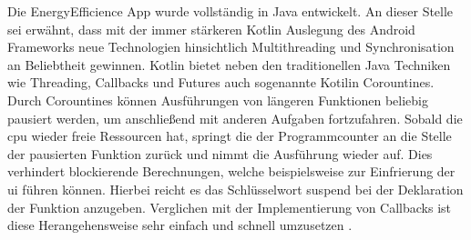 Die \glqq EnergyEfficience\grqq{} App wurde vollständig in Java entwickelt. An dieser Stelle sei erwähnt, dass mit der immer stärkeren Kotlin Auslegung des Android Frameworks neue Technologien hinsichtlich Multithreading und Synchronisation an Beliebtheit gewinnen. Kotlin bietet neben den traditionellen Java Techniken wie Threading, Callbacks und Futures auch sogenannte Kotilin Corountines. Durch Corountines können Ausführungen von längeren Funktionen beliebig pausiert werden, um anschließend mit anderen Aufgaben fortzufahren. Sobald die \ac{cpu} wieder freie Ressourcen hat, springt die der Programmcounter an die Stelle der pausierten Funktion zurück und nimmt die Ausführung wieder auf. Dies verhindert blockierende Berechnungen, welche beispielsweise zur Einfrierung der \ac{ui} führen können. Hierbei reicht es das Schlüsselwort \glqq suspend\grqq{} bei der Deklaration der Funktion anzugeben. Verglichen mit der Implementierung von Callbacks ist diese Herangehensweise sehr einfach und schnell umzusetzen \cite{kotlin-corountines}.

